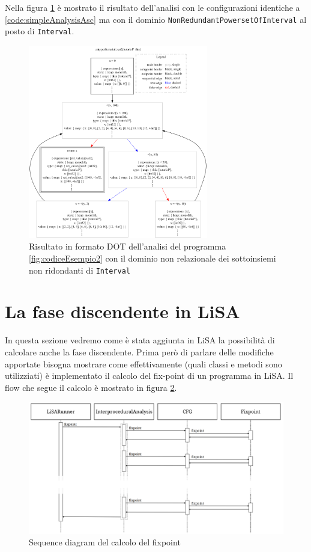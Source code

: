 Nella figura \ref{fig:risultatoAscPowerset} è mostrato il risultato dell'analisi con le configurazioni identiche a \ref{code:simpleAnalysisAsc} ma con il dominio \texttt{NonRedundantPowersetOfInterval} al posto di \texttt{Interval}.
\begin{figure}[ht]
	\centering
	\includegraphics[width=0.7\textwidth]{Immagini/graphvizAscPowerset.png}
	\caption{Risultato in formato DOT dell'analisi del programma \ref{fig:codiceEsempio2} con il dominio non relazionale dei sottoinsiemi non ridondanti di \texttt{Interval}}
	\label{fig:risultatoAscPowerset}
\end{figure}

\section{La fase discendente in LiSA}\label{sec:descendingLiSA}
In questa sezione vedremo come è stata aggiunta in LiSA la possibilità di calcolare anche la fase discendente. Prima però di parlare delle modifiche apportate bisogna mostrare come effettivamente (quali classi e metodi sono utilizziati) è implementato il calcolo del fix-point di un programma in LiSA. Il flow che segue il calcolo è mostrato in figura \ref{fig:flowFixpoint}. 
\begin{figure}[ht]
	\centering
	\includegraphics[width=\textwidth]{Immagini/flowFixpoint.png}
	\caption{Sequence diagram del calcolo del fixpoint}
	\label{fig:flowFixpoint}
\end{figure}

